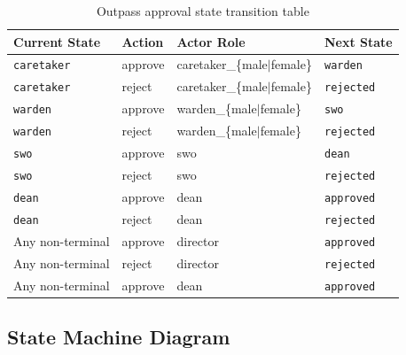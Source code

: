 \documentclass[12pt,a4paper]{report}
\newcommand{\code}[1]{\texttt{#1}}
\begin{document}
\begin{table}[H]
\centering
\caption{Outpass approval state transition table}
\label{tab:statetrans}
\renewcommand{\arraystretch}{1.3}
\begin{tabular}{llll}
\toprule
\textbf{Current State} & \textbf{Action} & \textbf{Actor Role} & \textbf{Next State} \\
\midrule
\code{caretaker} & approve & caretaker\_\{male$|$female\} & \code{warden} \\
\code{caretaker} & reject  & caretaker\_\{male$|$female\} & \code{rejected} \\
\code{warden}    & approve & warden\_\{male$|$female\}    & \code{swo} \\
\code{warden}    & reject  & warden\_\{male$|$female\}    & \code{rejected} \\
\code{swo}       & approve & swo                          & \code{dean} \\
\code{swo}       & reject  & swo                          & \code{rejected} \\
\code{dean}      & approve & dean                         & \code{approved} \\
\code{dean}      & reject  & dean                         & \code{rejected} \\
Any non-terminal & approve & director                     & \code{approved} \\
Any non-terminal & reject  & director                     & \code{rejected} \\
Any non-terminal & approve & dean                         & \code{approved} \\
\bottomrule
\end{tabular}
\end{table}

\subsection{State Machine Diagram}
\end{document}
